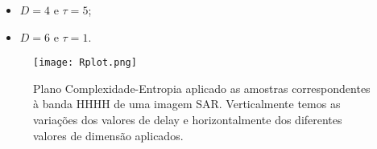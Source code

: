 \documentclass[12pt]{article}
\begin{document}
\begin{itemize}
    \item $D = 4$ e $\tau = 5$;
    \item $D = 6$ e $\tau = 1$.
\end{itemize}

\begin{figure}[!h]
	\centering
	\texttt{[image: Rplot.png]}        
     \caption{Plano Complexidade-Entropia aplicado as amostras correspondentes à banda HHHH de uma imagem SAR. Verticalmente temos as variações dos valores de delay e horizontalmente dos diferentes valores de dimensão aplicados.}
     \label{fig:Plano}
\end{figure}





\end{document}
